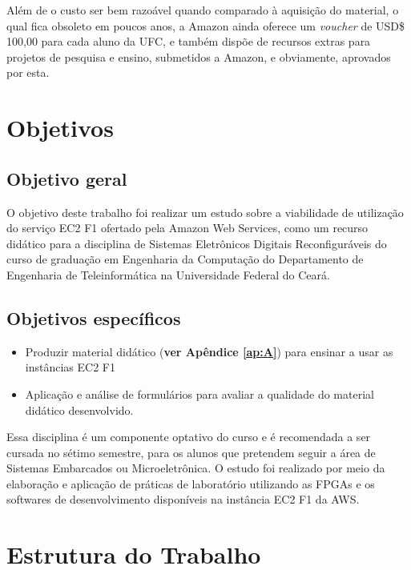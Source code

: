 Além de o custo ser bem razoável quando comparado à aquisição do material, o qual fica obsoleto em poucos anos, a Amazon ainda oferece um \textit{voucher} de USD\$ 100,00 para cada aluno da UFC, e também dispõe de recursos extras para projetos de pesquisa e ensino, submetidos a Amazon, e obviamente, aprovados por esta.
 
 
\section{Objetivos}\label{sec:objetivo}

\subsection{Objetivo geral}
O objetivo deste trabalho foi realizar um estudo sobre a viabilidade de utilização do serviço EC2 F1 ofertado pela Amazon Web Services, como um recurso didático para a disciplina de Sistemas Eletrônicos Digitais Reconfiguráveis do curso de graduação em Engenharia da Computação do Departamento de Engenharia de Teleinformática na Universidade Federal do Ceará.

\subsection{Objetivos específicos}
 \begin{itemize}
 \item Produzir material didático (\textbf{ver Apêndice \ref{ap:A}}) para ensinar a usar as instâncias EC2 F1 
 
 \item Aplicação e análise de formulários para avaliar a qualidade do material didático desenvolvido.
 \end{itemize}


Essa disciplina é um componente optativo do curso e é recomendada a ser cursada no sétimo semestre, para os alunos que pretendem seguir a área de Sistemas Embarcados ou Microeletrônica. O estudo foi realizado por meio da elaboração e aplicação de práticas de laboratório utilizando as FPGAs e os softwares de desenvolvimento disponíveis na instância EC2 F1 da AWS.


\section{Estrutura do Trabalho}\label{sec:estrutura}
 
